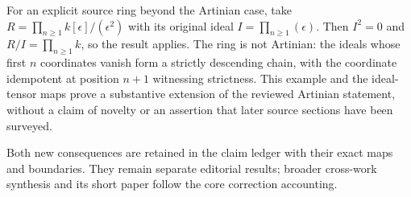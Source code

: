 For an explicit source ring beyond the Artinian case, take \(R=\prod_{n\geq1}k[\epsilon]/(\epsilon^2)\) with its original ideal \(I=\prod_{n\geq1}(\epsilon)\). Then \(I^2=0\) and \(R/I=\prod_{n\geq1}k\), so the result applies. The ring is not Artinian: the ideals whose first \(n\) coordinates vanish form a strictly descending chain, with the coordinate idempotent at position \(n+1\) witnessing strictness. This example and the ideal-tensor maps prove a substantive extension of the reviewed Artinian statement, without a claim of novelty or an assertion that later source sections have been surveyed.

Both new consequences are retained in the claim ledger with their exact maps and boundaries. They remain separate editorial results; broader cross-work synthesis and its short paper follow the core correction accounting.
